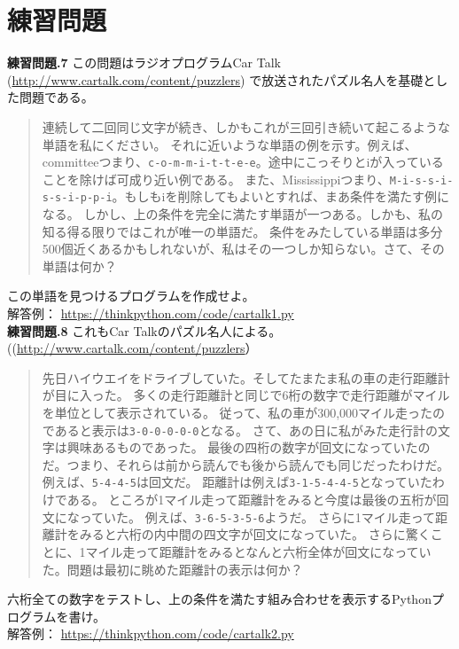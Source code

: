 \documentclass[a4j,12pt,makeidx]{jbook}
\newcommand{\tp}{\thechapter}
\begin{document}
\section{練習問題}
{\bf 練習問題\tp.7} この問題はラジオプログラムCar Talk　
(\url{http://www.cartalk.com/content/puzzlers})
で放送されたパズル名人を基礎とした問題である。
\begin{quote}
連続して二回同じ文字が続き、しかもこれが三回引き続いて起こるような単語を私にください。
それに近いような単語の例を示す。例えば、committeeつまり、{\tt c-o-m-m-i-t-t-e-e}。途中にこっそりとiが入っていることを除けば可成り近い例である。
また、Mississippiつまり、{\tt M-i-s-s-i-s-s-i-p-p-i}。もしもiを削除してもよいとすれば、まあ条件を満たす例になる。
しかし、上の条件を完全に満たす単語が一つある。しかも、私の知る得る限りではこれが唯一の単語だ。
条件をみたしている単語は多分500個近くあるかもしれないが、私はその一つしか知らない。さて、その単語は何か？
\end{quote}
この単語を見つけるプログラムを作成せよ。\\
解答例： \url{https://thinkpython.com/code/cartalk1.py} \\

\noindent
{\bf 練習問題\tp.8} これもCar Talkのパズル名人による。
 ((\url{http://www.cartalk.com/content/puzzlers}） 
\begin{quote}
先日ハイウエイをドライブしていた。そしてたまたま私の車の走行距離計が目に入った。
多くの走行距離計と同じで6桁の数字で走行距離がマイルを単位として表示されている。
従って、私の車が300,000マイル走ったのであると表示は{\tt 3-0-0-0-0-0}となる。
さて、あの日に私がみた走行計の文字は興味あるものであった。
最後の四桁の数字が回文になっていたのだ。つまり、それらは前から読んでも後から読んでも同じだったわけだ。
例えば、{\tt 5-4-4-5}は回文だ。
距離計は例えば{\tt 3-1-5-4-4-5}となっていたわけである。
ところが1マイル走って距離計をみると今度は最後の五桁が回文になっていた。
例えば、{\tt 3-6-5-3-5-6}ようだ。
さらに1マイル走って距離計をみると六桁の内中間の四文字が回文になっていた。
さらに驚くことに、1マイル走って距離計をみるとなんと六桁全体が回文になっていた。問題は最初に眺めた距離計の表示は何か？
\end{quote}
六桁全ての数字をテストし、上の条件を満たす組み合わせを表示するPythonプログラムを書け。\\
解答例： \url{https://thinkpython.com/code/cartalk2.py} \\
\end{document}
